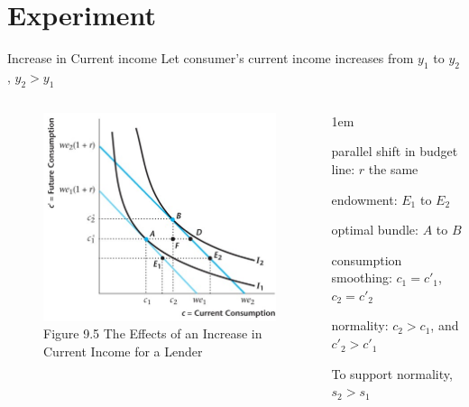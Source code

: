 \documentclass[11pt,aspectratio=43]{beamer}
\let\olditemize=\itemize
\let\endolditemize=\enditemize
\renewenvironment{itemize}{\olditemize \itemsep1em}{\endolditemize}
\theoremstyle{definition}
\begin{document}
\section{Experiment}
\label{sec:Experiment}

\begin{frame}{Increase in Current income}
\label{slide:Increase_in_Current_income}
    Let consumer's \alert{current} income increases from $ y_1 $ to $ y_{2}$, $ y_{2} > y_{1} $
    \begin{columns}
        \begin{column}{0.5\textwidth}
            \begin{figure}
                \caption{\scriptsize Figure 9.5  The Effects of an Increase in Current Income for a Lender}
                \includegraphics[width=\textwidth]{./figures/Figure9_5.jpg}
            \end{figure}
        \end{column}
        \begin{column}{0.5\textwidth}
            \begin{itemize}
                \item parallel shift in budget line: $ r $ the same
                \item endowment: $ E_{1} $ to $ E_{2} $
                \item optimal bundle: $ A $ to $ B $
                \item consumption smoothing: $c_{1} = c'_{1}$, $c_{2} = c'_{2}$
                \item normality: $ c_{2} > c_{1} $, and $ c'_{2} > c'_{1} $
                \item To support normality, $ s_{2} > s_{1} $
            \end{itemize}
        \end{column}
    \end{columns}
\end{frame}
\end{document}
